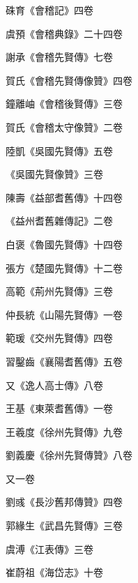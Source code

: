\begin{pinyinscope}
 硃育《會稽記》四卷



 虞預《會稽典錄》二十四卷



 謝承《會稽先賢傳》七卷



 賀氏《會稽先賢傳像贊》四卷



 鐘離岫《會稽後賢傳》三卷



 賀氏《會稽太守像贊》二卷



 陸凱《吳國先賢傳》五卷



 《吳國先賢像贊》三卷



 陳壽《益部耆舊傳》十四卷



 《益州耆舊雜傳記》二卷



 白褒《魯國先賢傳》十四卷



 張方《楚國先賢傳》十二卷



 高範《荊州先賢傳》三卷



 仲長統《山陽先賢傳》一卷



 範瑗《交州先賢傳》四卷



 習鑿齒《襄陽耆舊傳》五卷



 又《逸人高士傳》八卷



 王基《東萊耆舊傳》一卷



 王羲度《徐州先賢傳》九卷



 劉義慶《徐州先賢傳贊》八卷



 又一卷



 劉彧《長沙舊邦傳贊》四卷



 郭緣生《武昌先賢傳》三卷



 虞溥《江表傳》三卷



 崔蔚祖《海岱志》十卷




\end{pinyinscope}
